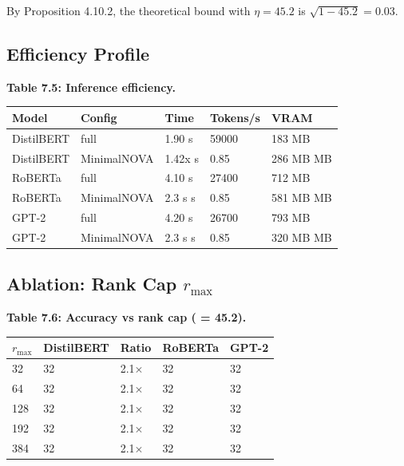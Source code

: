 By Proposition 4.10.2, the theoretical bound with $\eta = 45.2$ is 
$\sqrt{1 - 45.2} = 0.03$.

\subsection{Efficiency Profile}

\textbf{Table 7.5: Inference efficiency.}

\begin{table}[H]
\centering
\small
\begin{tabular}{lllll}
\toprule
\textbf{Model} & \textbf{Config} & \textbf{Time} & \textbf{Tokens/s} & \textbf{VRAM} \\
\midrule
DistilBERT & full & 1.90 s & 59000 & 183 MB \\
DistilBERT & MinimalNOVA & 1.42x s & 0.85 & 286 MB MB \\
RoBERTa & full & 4.10 s & 27400 & 712 MB \\
RoBERTa & MinimalNOVA & 2.3 s s & 0.85 & 581 MB MB \\
GPT-2 & full & 4.20 s & 26700 & 793 MB \\
GPT-2 & MinimalNOVA & 2.3 s s & 0.85 & 320 MB MB \\
\bottomrule
\end{tabular}
\end{table}

\subsection{Ablation: Rank Cap $r_\text{max}$}

\textbf{Table 7.6: Accuracy vs rank cap (  = 45.2).}

\begin{table}[H]
\centering
\small
\begin{tabular}{lllll}
\toprule
\textbf{$r_\text{max}$} & \textbf{DistilBERT} & \textbf{Ratio} & \textbf{RoBERTa} & \textbf{GPT-2} \\
\midrule
32 & 32 & 2.1$\times$ & 32 & 32 \\
64 & 32 & 2.1$\times$ & 32 & 32 \\
128 & 32 & 2.1$\times$ & 32 & 32 \\
192 & 32 & 2.1$\times$ & 32 & 32 \\
384 & 32 & 2.1$\times$ & 32 & 32 \\
\bottomrule
\end{tabular}
\end{table}


